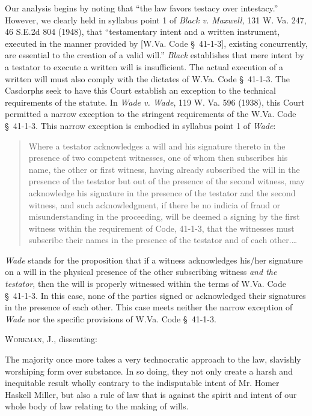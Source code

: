 Our analysis begins by noting that ``the law favors testacy over intestacy.''
However, we clearly held in syllabus point 1 of \textit{Black v. Maxwell, }131
W. Va. 247, 46 S.E.2d 804 (1948), that ``testamentary intent and a written
instrument, executed in the manner provided by [W.Va. Code {\S}~41-1-3],
existing concurrently, are essential to the creation of a valid will.''
\textit{Black} establishes that mere intent by a testator to execute a written
will is insufficient. The actual execution of a written will must also comply
with the dictates of W.Va. Code \S~41-1-3. The Casdorphs seek to have this
Court establish an exception to the technical requirements of the statute. In
\textit{Wade v. Wade}, 119 W. Va. 596 (1938), this Court permitted a narrow
exception to the stringent requirements of the W.Va. Code \S~41-1-3. This
narrow exception is embodied in syllabus point 1 of \textit{Wade}: 
\begin{quote}
Where a testator acknowledges a will and his signature thereto in the presence
of two competent witnesses, one of whom then subscribes his name, the other or
first witness, having already subscribed the will in the presence of the
testator but out of the presence of the second witness, may acknowledge his
signature in the presence of the testator and the second witness, and such
acknowledgment, if there be no indicia of fraud or misunderstanding in the
proceeding, will be deemed a signing by the first witness within the
requirement of Code, 41-1-3, that the witnesses must subscribe their names in
the presence of the testator and of each other.\dots
\end{quote}

\textit{Wade} stands for the proposition that if a witness acknowledges his/her
signature on a will in the physical presence of the other subscribing witness
\textit{and the testator}, then the will is properly witnessed within the terms
of W.Va. Code \S~41-1-3. In this case, none of the parties signed or
acknowledged their signatures in the presence of each other. This case meets
neither the narrow exception of \textit{Wade} nor the specific provisions of
W.Va. Code \S~41-1-3. 

\textsc{Workman}, J., dissenting: 

The majority once more takes a very technocratic approach to the law, slavishly
worshiping form over substance. In so doing, they not only create a harsh and
inequitable result wholly contrary to the indisputable intent of Mr. Homer
Haskell Miller, but also a rule of law that is against the spirit and intent of
our whole body of law relating to the making of wills. 

